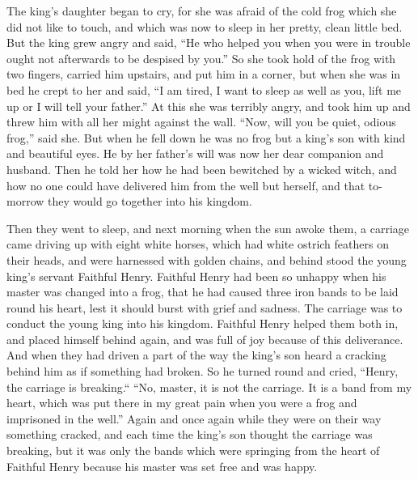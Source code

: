 \documentclass{article}
\begin{document}
The king's daughter began to cry, for she was afraid of the cold frog which she did not like to touch, and which was now to sleep in her pretty, clean little bed.  But the king grew angry and said, “He who helped you when you were in trouble ought not afterwards to be despised by you.”  So she took hold of the frog with two fingers, carried him upstairs, and put him in a corner, but when she was in bed he crept to her and said, “I am tired, I want to sleep as well as you, lift me up or I will tell your father.”  At this she was terribly angry, and took him up and threw him with all her might against the wall.  “Now, will you be quiet, odious frog,” said she.  But when he fell down he was no frog but a king's son with kind and beautiful eyes.  He by her father's will was now her dear companion and husband.  Then he told her how he had been bewitched by a wicked witch, and how no one could have delivered him from the well but herself, and that to-morrow they would go together into his kingdom.

Then they went to sleep, and next morning when the sun awoke them, a carriage came driving up with eight white horses, which had white ostrich feathers on their heads, and were harnessed with golden chains, and behind stood the young king's servant Faithful Henry. Faithful Henry had been so unhappy when his master was changed into a frog, that he had caused three iron bands to be laid round his heart, lest it should burst with grief and sadness.  The carriage was to conduct the young king into his kingdom.  Faithful Henry helped them both in, and placed himself behind again, and was full of joy because of this deliverance.  And when they had driven a part of the way the king's son heard a cracking behind him as if something had broken. So he turned round and cried, “Henry, the carriage is breaking.“ “No, master, it is not the carriage.  It is a band from my heart, which was put there in my great pain when you were a frog and imprisoned in the well.”  Again and once again while they were on their way something cracked, and each time the king's son thought the carriage was breaking, but it was only the bands which were springing from the heart of Faithful Henry because his master was set free and was happy.
\end{document}
